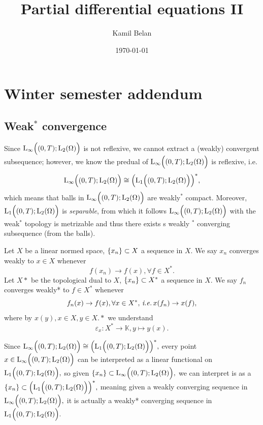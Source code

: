 \documentclass{article}
\title{Partial differential equations II}
\date{\today}
\author{Kamil Belan}
\begin{document}

\maketitle
\tableofcontents

\section{Winter semester addendum}
\label{chap:addendum}

\subsection{Weak$^*$ convergence}
\label{sec:weakstarconv}
Since $\LinfIntX{0}{T}{\LpSet[2]{\Omega}}$ is not reflexive, we cannot extract a (weakly) convergent subsequence; however, we know the predual of $\LinfIntX{0}{T}{\LpSet[2]{\Omega}}$ is reflexive, i.e.
\[
	\LinfIntX{0}{T}{\LpSet[2]{\Omega}} \cong \qty(\LpIntX{1}{0}{T}{\LpSet[2]{\Omega}})^{*},
\]
which means that balls in $\LinfIntX{0}{T}{\LpSet[2]{\Omega}}$ are weakly$^{*}$ compact. Moreover, $\LpIntX{1}{0}{T}{\LpSet[2]{\Omega}}$ is \textit{separable}, from which it follows $\LinfIntX{0}{T}{\LpSet[2]{\Omega}}$ with the weak$^{*}$ topology is metrizable and thus there exists s weakly $^{*}$ converging subsequence (from the balls).

\begin{example}
	Let $X$ be a linear normed space, $\qty{x_n} \subset X$ a sequence in $X$. We say $x_n$ converges weakly to $x \in X$ whenever
	\[
		f(x_n) \to f(x), \forall f \in X^{*}.
	\]
	Let $X*$ be the topological dual to $X$, $\qty{x_n} \subset X^{*}$ a sequence in $X$. We say $f_n$ converges weakly* to $f \in X^{*}$ whenever
	\[
		f_n(x) \to f(x), \forall x \in X^{*}, \, \text{\textit{i.e.}} \, x(f_n) \to x(f),
	\]
	where by $x(y), x \in X, y \in X.*$ we understand
	\[
		\varepsilon_x : X^{*} \to \mathbb{K}, y \mapsto y(x).
	\]

	Since $\LinfIntX{0}{T}{\LpSet[2]{\Omega}} \cong \qty(\LpIntX{1}{0}{T}{\LpSet[2]{\Omega}})^{*} ,$ every point $x \in \LinfIntX{0}{T}{\LpSet[2]{\Omega}}$ can be interpreted as a linear functional on $\LpIntX{1}{0}{T}{\LpSet[2]{\Omega}},$ so given $\qty{x_n} \subset \LinfIntX{0}{T}{\LpSet[2]{\Omega}},$ we can interpret is as a $\qty{x_n} \subset \qty(\LpIntX{1}{0}{T}{\LpSet[2]{\Omega}})^{*},$ meaning given a weakly converging sequence in $\LinfIntX{0}{T}{\LpSet[2]{\Omega}},$ it is actually a weakly* converging sequence in $\LpIntX{1}{0}{T}{\LpSet[2]{\Omega}}.$
\end{example}
\end{document}
